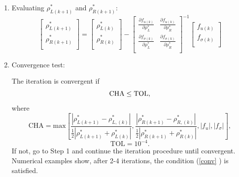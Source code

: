 \documentclass[review]{elsarticle}
\numberwithin{equation}{section}
\numberwithin{table}{section}
\begin{document}
\begin{enumerate}[Step 1]
  \item  Evaluating  $\rho_{L(k+1)}^*$ and $\rho_{R(k+1)}^*$:
\begin{equation}
\left[ \begin{array}{l}
 \rho _{L(k+1)}^*\\
\rho_{R(k+1)}^*\\
\end{array}
\right] =
\left[ \begin{array}{l}
 \rho _{L(k)}^*\\
\rho_{R(k)}^*\\
\end{array}
\right]-
\left[ \begin{array}{ll}
\frac{\partial f_{u(k)}}{\partial \rho_L^*} & \frac{\partial f_{u(k)}}{\partial \rho_R^*}\\
\frac{\partial f_{\sigma(k)}}{\partial \rho_L^*} & \frac{\partial f_{\sigma(k)}}{\partial \rho_R^*}\\
\end{array}
\right]^{-1}
\left[ \begin{array}{l}
f_{u(k)}\\
f_{\sigma(k)}\\
\end{array}
\right]
\end{equation}

\item Convergence test:

The iteration is convergent if
\begin{equation}{\label{conv}}
  \text{CHA} \le \text{TOL},
\end{equation}
where
\begin{equation}
\text{CHA} = \text{max} \left[
\frac{|\rho_{L(k+1)}^*- \rho_{L,(k)}^*|}{\frac{1}{2}|\rho_{L(k+1)}^*+\rho_{L(k)}^*|},   \frac{|\rho_{R(k+1)}^*- \rho_{R,(k)}^*|}{\frac{1}{2}|\rho_{R(k+1)}^*+\rho_{R(k)}^*|},|f_{u}|,|f_{\sigma}|\right],
\end{equation}
$$\text{TOL} = 10^{-4}.$$
If not, go to Step 1 and continue the iteration procedure until convergent. Numerical examples show, after 2-4 iterations, the condition (\ref{conv} ) is satisfied.
\end{enumerate}
\end{document}
